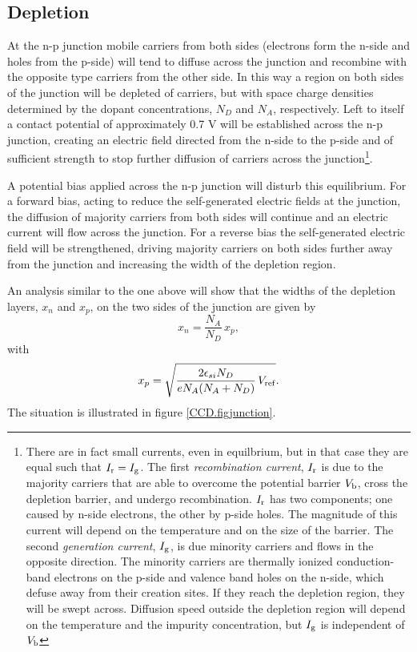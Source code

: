 \subsection{Depletion}

At the n-p junction mobile carriers from both sides (electrons form
the n-side and holes from the p-side) will tend to diffuse across the
junction and recombine with the opposite type carriers from the other
side. In this way a region on both sides of the junction will be
depleted of carriers, but with space charge densities determined by
the dopant concentrations, $N_D$ and $N_A$, respectively. Left to
itself a contact potential of approximately 0.7 V will be established
across the n-p junction, creating an electric field directed from the
n-side to the p-side and of sufficient strength to stop further
diffusion of carriers across the junction\footnote{There are in fact
  small currents, even in equilbrium, but in that case they are equal
  such that $I_{\rm r}=I_{\rm g}$. The first {\it recombination
    current}, $I_{\rm r}$ is due to the majority carriers that are
  able to overcome the potential barrier $V_{\rm b}$, cross the
  depletion barrier, and undergo recombination. $I_{\rm r}$ has two
  components; one caused by n-side electrons, the other by p-side
  holes. The magnitude of this current will depend on the temperature
  and on the size of the barrier. The second {\it generation current},
  $I_{\rm g}$, is due minority carriers and flows in the opposite
  direction. The minority carriers are thermally ionized
  conduction-band electrons on the p-side and valence band holes on
  the n-side, which defuse away from their creation sites. If they
  reach the depletion region, they will be swept across. Diffusion
  speed outside the depletion region will depend on the temperature
  and the impurity concentration, but $I_{\rm g}$ is independent of $V_{\rm b}$}.

A potential bias applied across the n-p junction will disturb this
equilibrium. For a forward bias, acting to reduce the self-generated
electric fields at the junction, the diffusion of majority carriers
from both sides will continue and an electric current will flow across
the junction. For a reverse bias the self-generated electric field
will be strengthened, driving majority carriers on both sides further
away from the junction and increasing the width of the depletion
region.

An analysis similar to the one above will show that the widths of the
depletion layers, $x_n$ and $x_p$, on the two sides of the junction
are given by
\begin{equation}
  x_n = \frac{N_A}{N_D} \, x_p,
 \label{eq:npjunction1}
\end{equation}
with
\begin{equation}
  x_p = \sqrt{\frac{2\epsilon_{si} N_D}{eN_A(N_A+N_D)} \, V_{\rm ref}}. 
 \label{eq:npjunction2}
\end{equation}
The situation is illustrated in figure \ref{CCD.figjunction}.


